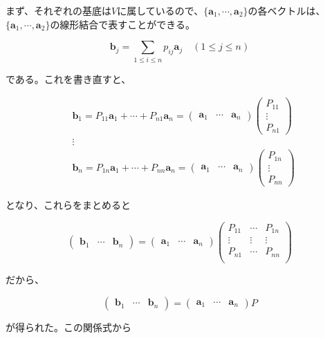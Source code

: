 \documentclass[dvipdfmx,autodetect-engine]{jsarticle}
\begin{document}
まず、それぞれの基底は$V$に属しているので、$\{\bm{a}_1, \cdots, \bm{a}_2\}$の各ベクトルは、$\{\bm{a}_1, \cdots, \bm{a}_2\}$の線形結合で表すことができる。

$$
\bm{b}_j = \sum_{1 \leq i \leq n} p_{ij}\bm{a}_j \quad (1 \leq j \leq n)
$$

である。これを書き直すと、

\begin{eqnarray*}
&\bm{b}_1 = P_{11}\bm{a}_1 + \cdots + P_{n1}\bm{a}_n = 
\begin{pmatrix}
\bm{a}_1 & \cdots & \bm{a}_n
\end{pmatrix}
\begin{pmatrix}
P_{11} \\
\vdots \\
P_{n1}
\end{pmatrix} \\
&\vdots \\
&\bm{b}_n = P_{1n}\bm{a}_1 + \cdots + P_{nn}\bm{a}_n = 
\begin{pmatrix}
\bm{a}_1 & \cdots & \bm{a}_n
\end{pmatrix}
\begin{pmatrix}
P_{1n} \\
\vdots \\
P_{nn}
\end{pmatrix}
\end{eqnarray*}

となり、これらをまとめると

$$
\begin{pmatrix}
\bm{b}_1 & \cdots & \bm{b}_n
\end{pmatrix} = 
\begin{pmatrix}
\bm{a}_1 & \cdots & \bm{a}_n
\end{pmatrix}
\begin{pmatrix}
P_{11} & \cdots & P_{1n} \\
\vdots & \vdots & \vdots \\
P_{n1} & \cdots & P_{nn} \\
\end{pmatrix}
$$

だから、

$$
\begin{pmatrix}
\bm{b}_1 & \cdots & \bm{b}_n
\end{pmatrix} = 
\begin{pmatrix}
\bm{a}_1 & \cdots & \bm{a}_n
\end{pmatrix}P
$$

が得られた。この関係式から
\end{document}
